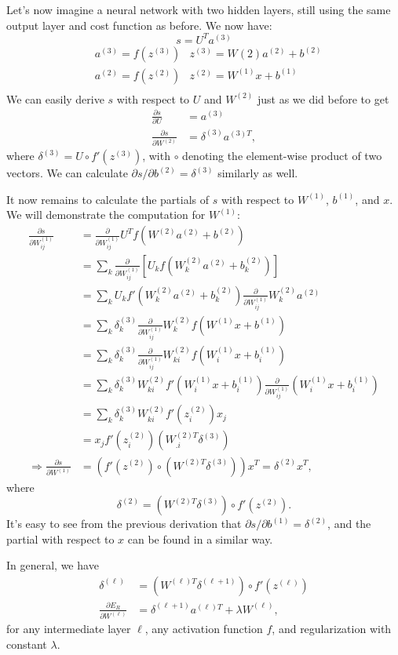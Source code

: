 Let's now imagine a neural network with two hidden layers, still using the same output layer and cost function as before. We now have:
$$s = U^Ta^{(3)}$$ 
\begin{align*}
&a^{(3)} = f(z^{(3)}) &z^{(3)} = W{(2)}a^{(2)} + b^{(2)}\\
&a^{(2)} = f(z^{(2)}) &z^{(2)} = W^{(1)}x + b^{(1)}\\
\end{align*}
We can easily derive $s$ with respect to $U$ and $W^{(2)}$ just as we did before to get
\begin{align*}
\frac{\partial s}{\partial U} &= a^{(3)} \\
\frac{\partial s}{\partial W^{(2)}} &= \delta^{(3)}a^{(3)T},
\end{align*}
where $\delta^{(3)} = U \circ f'(z^{(3)})$, with $\circ$ denoting the element-wise product of two vectors. We can calculate $\partial s/\partial b^{(2)} = \delta^{(3)}$ similarly as well.

It now remains to calculate the partials of $s$ with respect to $W^{(1)}$, $b^{(1)}$, and $x$. We will demonstrate the computation for $W^{(1)}$:
\begin{align*}
\frac{\partial s}{\partial W_{ij}^{(1)}} &= \frac{\partial}{\partial W_{ij}^{(1)}}U^Tf(W^{(2)}a^{(2)} + b^{(2)})\\
&= \sum_k\frac{\partial}{\partial W_{ij}^{(1)}} \left[U_k f(W_k^{(2)}a^{(2)} + b_k^{(2)}) \right]\\
&= \sum_k  U_kf'(W_k^{(2)}a^{(2)} + b_k^{(2)}) \frac{\partial}{\partial W_{ij}^{(1)}} W_k^{(2)}a^{(2)}\\
&= \sum_k \delta^{(3)}_k \frac{\partial}{\partial W_{ij}^{(1)}}W_k^{(2)}f(W^{(1)}x + b^{(1)})\\
&= \sum_k \delta^{(3)}_k \frac{\partial}{\partial W_{ij}^{(1)}}W_{ki}^{(2)}f(W_i^{(1)}x + b_i^{(1)})\\
&= \sum_k \delta^{(3)}_k W_{ki}^{(2)} f'(W_i^{(1)}x + b_i^{(1)})\frac{\partial}{\partial W_{ij}^{(1)}} \left(W_i^{(1)}x + b_i^{(1)}\right)\\
&= \sum_k \delta_k^{(3)} W_{ki}^{(2)} f'(z^{(2)}_i)x_j\\
&= x_jf'(z_i^{(2)})\left(W_{.i}^{(2)T}\delta^{(3)}\right)\\
\Rightarrow \frac{\partial s}{\partial W^{(1)}} &= \left(f'(z^{(2)}) \circ \left(W^{(2)T} \delta^{(3)}\right)\right) x^T = \delta^{(2)} x^T,
\end{align*}
where
$$\delta^{(2)} = \left(W^{(2)T} \delta^{(3)}\right) \circ f'(z^{(2)}).$$
It's easy to see from the previous derivation that $\partial s/\partial b^{(1)} = \delta^{(2)}$, and the partial with respect to $x$ can be found in a similar way.

In general, we have
\begin{align*}
\delta^{(\ell)} &= \left(W^{(\ell)T}\delta^{(\ell + 1)}\right) \circ f'(z^{(\ell)})\\
\frac{\partial E_R}{\partial W^{(\ell)}} &= \delta^{(\ell + 1)}a^{(\ell)T} + \lambda W^{(\ell)},
\end{align*}
for any intermediate layer $\ell$, any activation function $f$, and regularization with constant $\lambda$.
